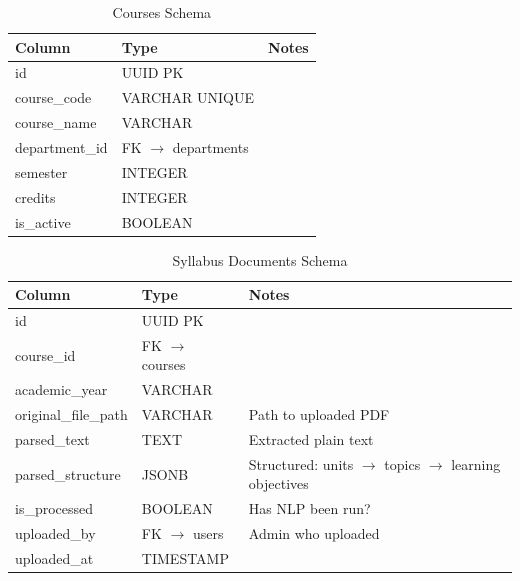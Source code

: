 {\begin{table}[h]
    \centering
    \caption{Courses Schema}
    \begin{tabularx}{\textwidth}{|p{}|p{}|X|}
        \hline
        \textbf{Column} & \textbf{Type} & \textbf{Notes} \\ \hline
        id & UUID PK & \\ \hline
        course\_code & VARCHAR UNIQUE & \\ \hline
        course\_name & VARCHAR & \\ \hline
        department\_id & FK $\rightarrow$ departments & \\ \hline
        semester & INTEGER & \\ \hline
        credits & INTEGER & \\ \hline
        is\_active & BOOLEAN & \\ \hline
    \end{tabularx}
\end{table}

\begin{table}[h]
    \centering
    \caption{Syllabus Documents Schema}
    \begin{tabularx}{\textwidth}{|p{}|p{}|X|}
        \hline
        \textbf{Column} & \textbf{Type} & \textbf{Notes} \\ \hline
        id & UUID PK & \\ \hline
        course\_id & FK $\rightarrow$ courses & \\ \hline
        academic\_year & VARCHAR & \\ \hline
        original\_file\_path & VARCHAR & Path to uploaded PDF \\ \hline
        parsed\_text & TEXT & Extracted plain text \\ \hline
        parsed\_structure & JSONB & Structured: units $\rightarrow$ topics $\rightarrow$ learning objectives \\ \hline
        is\_processed & BOOLEAN & Has NLP been run? \\ \hline
        uploaded\_by & FK $\rightarrow$ users & Admin who uploaded \\ \hline
        uploaded\_at & TIMESTAMP & \\ \hline
    \end{tabularx}
\end{table}

}
